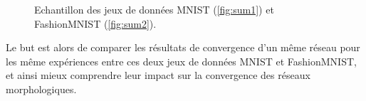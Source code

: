 \vspace{-0.2mm}
\begin{figure}[ht]
  \begin{center}
      \hspace{12.0mm}
    \vspace{-0.1mm}
    \caption{ \centering Echantillon des jeux de données MNIST (\ref{fig:sum1}) et FashionMNIST (\ref{fig:sum2}).}
    \label{fig:mnist_and_fashionmnist}
  \end{center}
\end{figure}

\vspace{-3.2mm}
Le but est alors de comparer les résultats de convergence d'un même réseau pour les même expériences entre ces deux jeux de données MNIST et FashionMNIST, et ainsi mieux comprendre leur impact sur la convergence des réseaux morphologiques.
